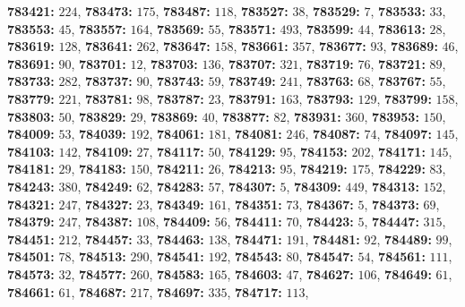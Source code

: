 \textsf{\bfseries 783421:} $224$, \textsf{\bfseries 783473:} $175$, \textsf{\bfseries 783487:} $118$, \textsf{\bfseries 783527:} $38$, \textsf{\bfseries 783529:} $7$, \textsf{\bfseries 783533:} $33$, \textsf{\bfseries 783553:} $45$, \textsf{\bfseries 783557:} $164$, \textsf{\bfseries 783569:} $55$, \textsf{\bfseries 783571:} $493$, \textsf{\bfseries 783599:} $44$, \textsf{\bfseries 783613:} $28$, \textsf{\bfseries 783619:} $128$, \textsf{\bfseries 783641:} $262$, \textsf{\bfseries 783647:} $158$, \textsf{\bfseries 783661:} $357$, \textsf{\bfseries 783677:} $93$, \textsf{\bfseries 783689:} $46$, \textsf{\bfseries 783691:} $90$, \textsf{\bfseries 783701:} $12$, \textsf{\bfseries 783703:} $136$, \textsf{\bfseries 783707:} $321$, \textsf{\bfseries 783719:} $76$, \textsf{\bfseries 783721:} $89$, \textsf{\bfseries 783733:} $282$, \textsf{\bfseries 783737:} $90$, \textsf{\bfseries 783743:} $59$, \textsf{\bfseries 783749:} $241$, \textsf{\bfseries 783763:} $68$, \textsf{\bfseries 783767:} $55$, \textsf{\bfseries 783779:} $221$, \textsf{\bfseries 783781:} $98$, \textsf{\bfseries 783787:} $23$, \textsf{\bfseries 783791:} $163$, \textsf{\bfseries 783793:} $129$, \textsf{\bfseries 783799:} $158$, \textsf{\bfseries 783803:} $50$, \textsf{\bfseries 783829:} $29$, \textsf{\bfseries 783869:} $40$, \textsf{\bfseries 783877:} $82$, \textsf{\bfseries 783931:} $360$, \textsf{\bfseries 783953:} $150$, \textsf{\bfseries 784009:} $53$, \textsf{\bfseries 784039:} $192$, \textsf{\bfseries 784061:} $181$, \textsf{\bfseries 784081:} $246$, \textsf{\bfseries 784087:} $74$, \textsf{\bfseries 784097:} $145$, \textsf{\bfseries 784103:} $142$, \textsf{\bfseries 784109:} $27$, \textsf{\bfseries 784117:} $50$, \textsf{\bfseries 784129:} $95$, \textsf{\bfseries 784153:} $202$, \textsf{\bfseries 784171:} $145$, \textsf{\bfseries 784181:} $29$, \textsf{\bfseries 784183:} $150$, \textsf{\bfseries 784211:} $26$, \textsf{\bfseries 784213:} $95$, \textsf{\bfseries 784219:} $175$, \textsf{\bfseries 784229:} $83$, \textsf{\bfseries 784243:} $380$, \textsf{\bfseries 784249:} $62$, \textsf{\bfseries 784283:} $57$, \textsf{\bfseries 784307:} $5$, \textsf{\bfseries 784309:} $449$, \textsf{\bfseries 784313:} $152$, \textsf{\bfseries 784321:} $247$, \textsf{\bfseries 784327:} $23$, \textsf{\bfseries 784349:} $161$, \textsf{\bfseries 784351:} $73$, \textsf{\bfseries 784367:} $5$, \textsf{\bfseries 784373:} $69$, \textsf{\bfseries 784379:} $247$, \textsf{\bfseries 784387:} $108$, \textsf{\bfseries 784409:} $56$, \textsf{\bfseries 784411:} $70$, \textsf{\bfseries 784423:} $5$, \textsf{\bfseries 784447:} $315$, \textsf{\bfseries 784451:} $212$, \textsf{\bfseries 784457:} $33$, \textsf{\bfseries 784463:} $138$, \textsf{\bfseries 784471:} $191$, \textsf{\bfseries 784481:} $92$, \textsf{\bfseries 784489:} $99$, \textsf{\bfseries 784501:} $78$, \textsf{\bfseries 784513:} $290$, \textsf{\bfseries 784541:} $192$, \textsf{\bfseries 784543:} $80$, \textsf{\bfseries 784547:} $54$, \textsf{\bfseries 784561:} $111$, \textsf{\bfseries 784573:} $32$, \textsf{\bfseries 784577:} $260$, \textsf{\bfseries 784583:} $165$, \textsf{\bfseries 784603:} $47$, \textsf{\bfseries 784627:} $106$, \textsf{\bfseries 784649:} $61$, \textsf{\bfseries 784661:} $61$, \textsf{\bfseries 784687:} $217$, \textsf{\bfseries 784697:} $335$, \textsf{\bfseries 784717:} $113$, 
